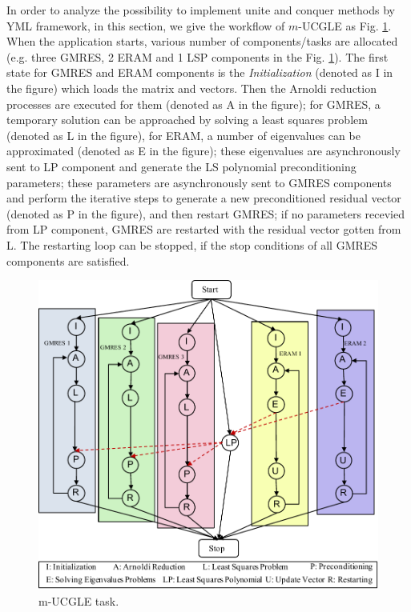 In order to analyze the possibility to implement unite and conquer methods by YML framework, in this section, we give the workflow of $m$-UCGLE as Fig. \ref{m-UCGLE-task}. When the application starts, various number of components/tasks are allocated (e.g. three GMRES, 2 ERAM and 1 LSP components in the Fig. \ref{m-UCGLE-task}). The first state for GMRES and ERAM components is the \textit{Initialization} (denoted as I in the figure) which loads the matrix and vectors. Then the Arnoldi reduction processes are executed for them (denoted as A in the figure); for GMRES, a temporary solution can be approached by solving a least squares problem (denoted as L in the figure), for ERAM, a number of eigenvalues can be approximated (denoted as E in the figure); these eigenvalues are asynchronously sent to LP component and generate the LS polynomial preconditioning parameters; these parameters are asynchronously sent to GMRES components and perform the iterative steps to generate a new preconditioned residual vector (denoted as P in the figure), and then restart GMRES; if no parameters recevied from LP component, GMRES are restarted with the residual vector gotten from L. The restarting loop can be stopped, if the stop conditions of all GMRES components are satisfied.

\begin{figure}[t]
	\centering
	\includegraphics[width=6.2in]{fig/m-UCGLE-task2.pdf}
	\caption{m-UCGLE task.}
	\label{m-UCGLE-task}
\end{figure}

